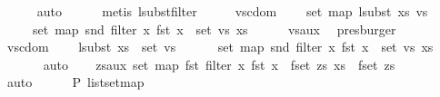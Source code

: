 \begin{isabellebody}
\ \ \ \ \isamarkupfalse%
\ auto\isanewline
\ \ \ \ \isamarkupfalse%
\ {\isacharparenleft}{\kern0pt}metis\ lsubst{\isacharunderscore}{\kern0pt}filter{\isacharparenright}{\kern0pt}\isanewline
\ \ \isamarkupfalse%
\ \isamarkupfalse%
\ vs{\isacharunderscore}{\kern0pt}cdom{\isacharcolon}{\kern0pt}\isanewline
\ \ \ \ {\isachardoublequoteopen}set\ {\isacharparenleft}{\kern0pt}map\ {\isacharparenleft}{\kern0pt}lsubst\ xs{\isacharparenright}{\kern0pt}\ vs{\isacharparenright}{\kern0pt}\ {\isacharequal}{\kern0pt}\isanewline
\ \ \ \ \ set\ {\isacharparenleft}{\kern0pt}map\ snd\ {\isacharparenleft}{\kern0pt}filter\ {\isacharparenleft}{\kern0pt}{\isasymlambda}x{\isachardot}{\kern0pt}\ fst\ x\ {\isasymin}\ set\ vs{\isacharparenright}{\kern0pt}\ xs{\isacharparenright}{\kern0pt}{\isacharparenright}{\kern0pt}{\isachardoublequoteclose}\isanewline
\ \ \ \ \isamarkupfalse%
\ vs{\isacharunderscore}{\kern0pt}aux{}\ \isamarkupfalse%
\ presburger\isanewline
\ \ \isamarkupfalse%
\ \isamarkupfalse%
\ vs{\isacharunderscore}{\kern0pt}cdom{}{\isacharcolon}{\kern0pt}\isanewline
\ \ \ \ {\isachardoublequoteopen}{\isacharparenleft}{\kern0pt}lsubst\ xs{\isacharparenright}{\kern0pt}\ {\isacharbackquote}{\kern0pt}\ set\ vs\ {\isacharequal}{\kern0pt}\isanewline
\ \ \ \ \ set\ {\isacharparenleft}{\kern0pt}map\ snd\ {\isacharparenleft}{\kern0pt}filter\ {\isacharparenleft}{\kern0pt}{\isasymlambda}x{\isachardot}{\kern0pt}\ fst\ x\ {\isasymin}\ set\ vs{\isacharparenright}{\kern0pt}\ xs{\isacharparenright}{\kern0pt}{\isacharparenright}{\kern0pt}{\isachardoublequoteclose}\isanewline
\ \ \ \ \ \isamarkupfalse%
\ auto\isanewline
\isanewline
\ \ \isamarkupfalse%
\ zs{\isacharunderscore}{\kern0pt}aux{}{\isacharcolon}{\kern0pt}\ {\isachardoublequoteopen}set\ {\isacharparenleft}{\kern0pt}map\ fst\ {\isacharparenleft}{\kern0pt}{\isacharparenleft}{\kern0pt}filter\ {\isacharparenleft}{\kern0pt}{\isasymlambda}x{\isachardot}{\kern0pt}\ fst\ x\ {\isasymin}\ fset\ zs{\isacharparenright}{\kern0pt}\ xs{\isacharparenright}{\kern0pt}{\isacharparenright}{\kern0pt}{\isacharparenright}{\kern0pt}\ {\isacharequal}{\kern0pt}\ fset\ zs{\isachardoublequoteclose}\isanewline
\ \ \ \ \isamarkupfalse%
\ auto\isanewline
\ \ \ \ \isamarkupfalse%
\ P{}\ list{\isachardot}{\kern0pt}set{\isacharunderscore}{\kern0pt}map\ \isamarkupfalse%

\end{isabellebody}
